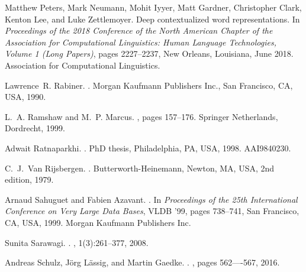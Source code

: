 \documentclass{nle}
\begin{document}
\begin{thebibliography}{}
Matthew Peters, Mark Neumann, Mohit Iyyer, Matt Gardner, Christopher Clark,
  Kenton Lee, and Luke Zettlemoyer.
\newblock Deep contextualized word representations.
\newblock In {\em Proceedings of the 2018 Conference of the North {A}merican
  Chapter of the Association for Computational Linguistics: Human Language
  Technologies, Volume 1 (Long Papers)}, pages 2227--2237, New Orleans,
  Louisiana, June 2018. Association for Computational Linguistics.

Lawrence~R. Rabiner.
.
\newblock Morgan Kaufmann Publishers Inc., San Francisco, CA, USA, 1990.

L.~A. Ramshaw and M.~P. Marcus.
, pages
  157--176.
\newblock Springer Netherlands, Dordrecht, 1999.

Adwait Ratnaparkhi.
.
\newblock PhD thesis, Philadelphia, PA, USA, 1998.
\newblock AAI9840230.

C.~J.~Van Rijsbergen.
.
\newblock Butterworth-Heinemann, Newton, MA, USA, 2nd edition, 1979.

Arnaud Sahuguet and Fabien Azavant.
.
\newblock In {\em Proceedings of the 25th International Conference on Very
  Large Data Bases}, VLDB '99, pages 738--741, San Francisco, CA, USA, 1999.
  Morgan Kaufmann Publishers Inc.

Sunita Sarawagi.
.
, 1(3):261--377, 2008.

Andreas Schulz, J{\"{o}}rg L{\"{a}}ssig, and Martin Gaedke.
.
, pages 562----567, 2016.


\end{thebibliography}
\end{document}
